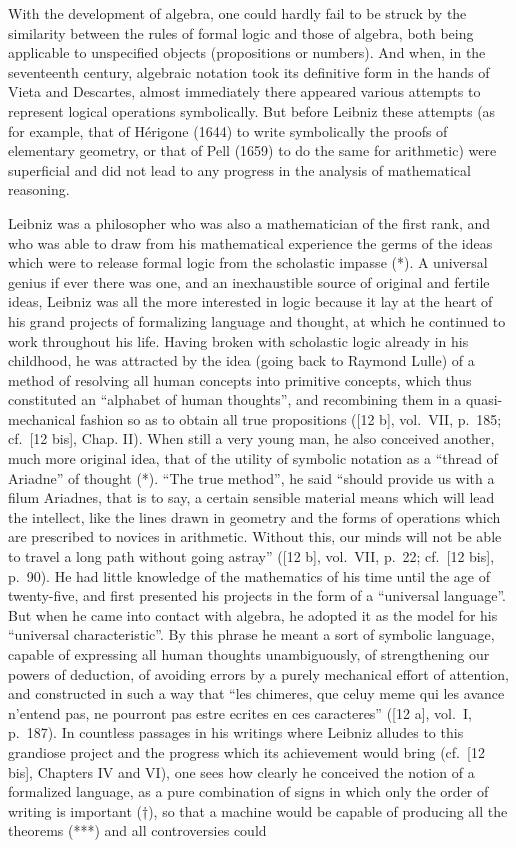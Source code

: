 With the development of algebra, one could hardly fail to be struck by the similarity between the rules of formal logic and those of algebra, both being applicable to unspecified objects (propositions or numbers). And when, in the seventeenth century, algebraic notation took its definitive form in the hands of Vieta and Descartes, almost immediately there appeared various attempts to represent logical operations symbolically. But before Leibniz these attempts (as for example, that of Hérigone (1644) to write symbolically the proofs of elementary geometry, or that of Pell (1659) to do the same for arithmetic) were superficial and did not lead to any progress in the analysis of mathematical reasoning.

Leibniz was a philosopher who was also a mathematician of the first rank, and who was able to draw from his mathematical experience the germs of the ideas which were to release formal logic from the scholastic impasse (*). A universal genius if ever there was one, and an inexhaustible source of original and fertile ideas, Leibniz was all the more interested in logic because it lay at the heart of his grand projects of formalizing language and thought, at which he continued to work throughout his life. Having broken with scholastic logic already in his childhood, he was attracted by the idea (going back to Raymond Lulle) of a method of resolving all human concepts into primitive concepts, which thus constituted an ``alphabet of human thoughts'', and recombining them in a quasi-mechanical fashion so as to obtain all true propositions ({[}12 b{]}, vol.~VII, p.~185; cf.~{[}12 bis{]}, Chap. II). When still a very young man, he also conceived another, much more original idea, that of the utility of symbolic notation as a ``thread of Ariadne'' of thought (*). ``The true method'', he said ``should provide us with a filum Ariadnes, that is to say, a certain sensible material means which will lead the intellect, like the lines drawn in geometry and the forms of operations which are prescribed to novices in arithmetic. Without this, our minds will not be able to travel a long path without going astray'' ({[}12 b{]}, vol.~VII, p.~22; cf.~{[}12 bis{]}, p.~90). He had little knowledge of the mathematics of his time until the age of twenty-five, and first presented his projects in the form of a ``universal language''. But when he came into contact with algebra, he adopted it as the model for his ``universal characteristic''. By this phrase he meant a sort of symbolic language, capable of expressing all human thoughts unambiguously, of strengthening our powers of deduction, of avoiding errors by a purely mechanical effort of attention, and constructed in such a way that ``les chimeres, que celuy meme qui les avance n'entend pas, ne pourront pas estre ecrites en ces caracteres'' ({[}12 a{]}, vol.~I, p.~187). In countless passages in his writings where Leibniz alludes to this grandiose project and the progress which its achievement would bring (cf.~{[}12 bis{]}, Chapters IV and VI), one sees how clearly he conceived the notion of a formalized language, as a pure combination of signs in which only the order of writing is important (†), so that a machine would be capable of producing all the theorems (***) and all controversies could 